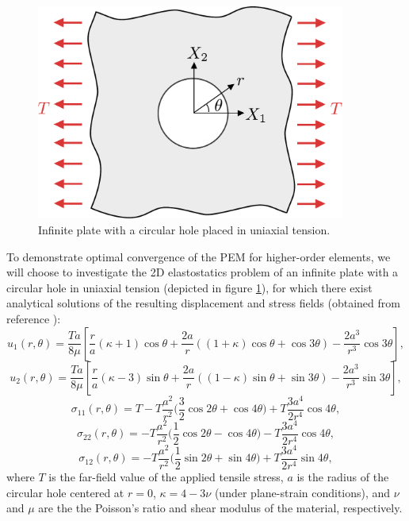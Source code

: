 \begin{figure}[!h]
  \centering
  \includegraphics[width=4.0in]{figures/plate_with_hole.pdf}  \caption{Infinite plate with a circular hole placed in uniaxial tension.}
  \label{fig:plate_with_hole_problem}
\end{figure}
To demonstrate optimal convergence of the PEM for higher-order elements, we will choose to investigate the 2D elastostatics problem of an infinite plate with a circular hole in uniaxial tension (depicted in figure \ref{fig:plate_with_hole_problem}), for which there exist analytical solutions of the resulting displacement and stress fields (obtained from reference \cite{Wikiversity:17}):
\begin{equation}
  u_1 (r,\theta) = \frac{Ta}{8\mu} \left[ \frac{r}{a} (\kappa + 1) \cos \theta + \frac{2a}{r} ((1+\kappa) \cos \theta + \cos 3 \theta) - \frac{2a^3}{r^3} \cos 3 \theta \right],
\end{equation}
\begin{equation}
  u_2 (r,\theta) = \frac{Ta}{8\mu} \left[ \frac{r}{a} (\kappa - 3) \sin \theta + \frac{2a}{r} ((1-\kappa) \sin \theta + \sin 3 \theta) - \frac{2a^3}{r^3} \sin 3 \theta \right],
\end{equation}
\begin{equation}
  \sigma_{11} (r, \theta) = T - T \frac{a^2}{r^2} \bigg( \frac{3}{2} \cos 2 \theta + \cos 4 \theta \bigg) + T \frac{3a^4}{2r^4} \cos 4 \theta,
\end{equation}
\begin{equation}
  \sigma_{22} (r, \theta) = - T \frac{a^2}{r^2} \bigg( \frac{1}{2} \cos 2 \theta - \cos 4 \theta \bigg) - T \frac{3a^4}{2r^4} \cos 4 \theta,
\end{equation}
\begin{equation}
  \sigma_{12} (r, \theta) = - T \frac{a^2}{r^2} \bigg( \frac{1}{2} \sin 2 \theta + \sin 4 \theta \bigg) + T \frac{3a^4}{2r^4} \sin 4 \theta,
\end{equation}
where $T$ is the far-field value of the applied tensile stress, $a$ is the radius of the circular hole centered at $r=0$, $\kappa = 4 - 3\nu$ (under plane-strain conditions), and $\nu$ and $\mu$ are the the Poisson's ratio and shear modulus of the material, respectively.

